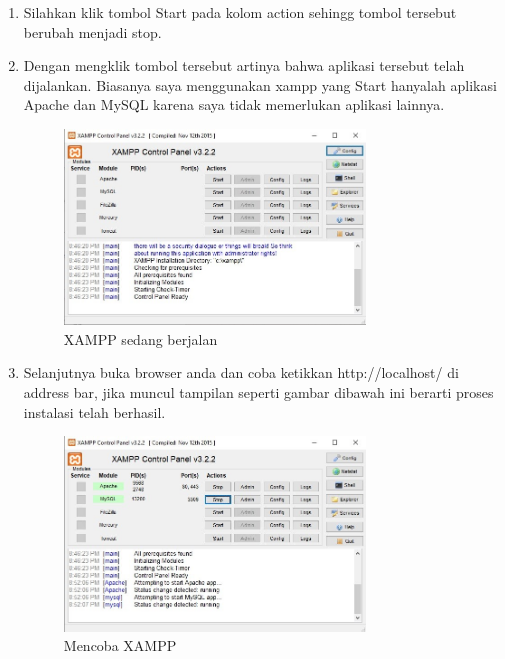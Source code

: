 \begin{enumerate}
\item Silahkan klik tombol Start pada kolom action sehingg tombol tersebut berubah menjadi stop. 
\item Dengan mengklik tombol tersebut artinya bahwa aplikasi tersebut telah dijalankan. Biasanya saya menggunakan xampp yang Start hanyalah aplikasi Apache dan MySQL karena saya tidak memerlukan aplikasi lainnya.
	\begin{figure}[H]
		\includegraphics[width=8cm]{figures/instalasi/xampp10.jpg}
		\centering
		\caption{XAMPP sedang berjalan}
	\end{figure}

\item Selanjutnya buka browser anda dan coba ketikkan http://localhost/ di address bar, jika muncul tampilan seperti gambar dibawah ini berarti proses instalasi telah berhasil.
	\begin{figure}[H]
		\includegraphics[width=8cm]{figures/instalasi/xampp11.jpg}
		\centering
		\caption{Mencoba XAMPP}
	\end{figure}
\end{enumerate}

